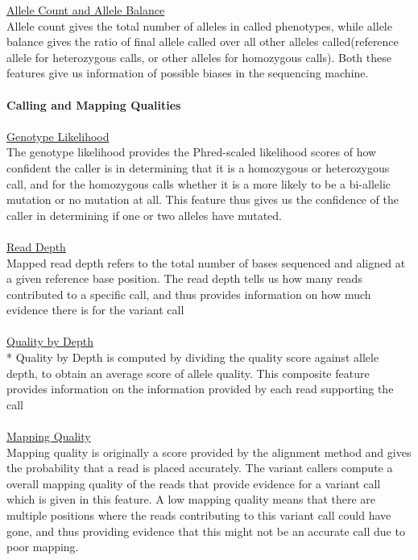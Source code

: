 \documentclass{article}
\begin{document}
\underline{Allele Count and Allele Balance}\\
Allele count gives the total number of alleles in called phenotypes, while allele balance gives the ratio of final allele called over all other alleles called(reference allele for heterozygous calls, or other alleles for homozygous calls). Both these features give us information of possible biases in the sequencing machine.\\\\
\textbf{Calling and Mapping Qualities} \\\\
\underline{Genotype Likelihood}\\
The genotype likelihood provides the Phred-scaled likelihood scores of how confident the caller is in determining that it is a homozygous or heterozygous call, and for the homozygous calls whether it is a more likely to be a bi-allelic mutation or no mutation at all. This feature thus gives us the confidence of the caller in determining if one or two alleles have mutated. \\\\ 
\underline{Read Depth}\\
Mapped read depth refers to the total number of bases sequenced and aligned at a given reference base position. The read depth tells us how many reads contributed to a specific call, and thus provides information on how much evidence there is for the variant call\\\\
\underline{Quality by Depth}\\*
Quality by Depth is computed by dividing the quality score against allele depth, to obtain an average score of allele quality. This composite feature provides information on the information provided by each read supporting the call\\\\
\underline{Mapping Quality}\\
Mapping quality is originally a score provided by the alignment method and gives the probability that a read is placed accurately. The variant callers compute a overall mapping quality of the reads that provide evidence for a variant call which is given in this feature. A low mapping quality means that there are multiple positions where the reads contributing to this variant call could have gone, and thus providing evidence that this might not be an accurate call due to poor mapping.\\\\
\newpage
\end{document}
